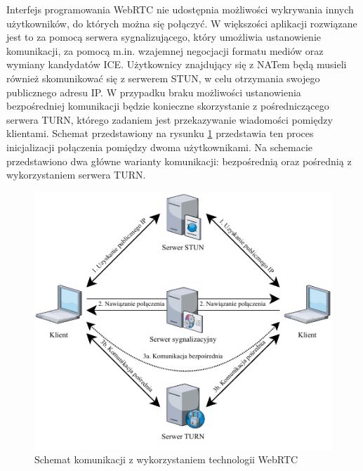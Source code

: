 \documentclass[language=polish,type=master]{aghmodern}
\begin{document}
Interfejs programowania WebRTC nie udostępnia możliwości wykrywania innych użytkowników, do których można się połączyć.
W większości aplikacji rozwiązane jest to za pomocą serwera sygnalizującego, który umożliwia ustanowienie komunikacji, za pomocą m.in. wzajemnej negocjacji formatu mediów oraz wymiany kandydatów ICE\footnotemark{}.
Użytkownicy znajdujący się z NATem\footnotemark{} będą musieli również
skomunikować się z serwerem STUN\footnotemark{}, w celu otrzymania swojego publicznego adresu IP.
W przypadku braku możliwości ustanowienia bezpośredniej komunikacji będzie konieczne skorzystanie z pośredniczącego serwera TURN\footnotemark{}, którego zadaniem jest przekazywanie wiadomości pomiędzy klientami.
Schemat przedstawiony na rysunku \ref{fig:webrtc} przedstawia ten proces inicjalizacji połączenia pomiędzy dwoma użytkownikami.
Na schemacie przedstawiono dwa główne warianty komunikacji: bezpośrednią oraz pośrednią z wykorzystaniem serwera TURN.

\begin{figure}[H]
    \centering
    \vspace*{15pt}
    \includegraphics[width=\textwidth]{images/webrtc.pdf}
    \caption{Schemat komunikacji z wykorzystaniem technologii WebRTC}
    \label{fig:webrtc}
\end{figure}
\end{document}
